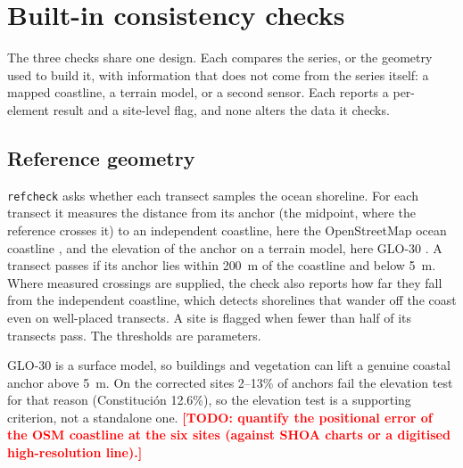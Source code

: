 \documentclass[authoryear,preprint,review,12pt]{elsarticle}
\newcommand{\todo}[1]{\textcolor{red}{\textbf{[TODO: #1]}}}
\begin{document}
\section{Built-in consistency checks}\label{sec:checks}
The three checks share one design. Each compares the series, or the geometry
used to build it, with information that does not come from the series itself:
a mapped coastline, a terrain model, or a second sensor. Each reports a
per-element result and a site-level flag, and none alters the data it checks.

\subsection{Reference geometry}\label{subsec:refcheck}
\texttt{refcheck} asks whether each transect samples the ocean shoreline. For
each transect it measures the distance from its anchor (the midpoint, where the
reference crosses it) to an independent coastline, here the OpenStreetMap ocean
coastline \citep{osmcoastline}, and the elevation of the anchor on a terrain
model, here GLO-30 \citep{glo30}. A transect passes if its anchor lies within
200~m of the coastline and below 5~m. Where measured crossings are supplied,
the check also reports how far they fall from the independent coastline, which
detects shorelines that wander off the coast even on well-placed transects. A
site is flagged when fewer than half of its transects pass. The thresholds are
parameters.

GLO-30 is a surface model, so buildings and vegetation can lift a genuine
coastal anchor above 5~m. On the corrected sites 2--13\% of anchors fail the
elevation test for that reason (Constituci\'on 12.6\%), so the elevation test
is a supporting criterion, not a standalone one.
\todo{quantify the positional error of the OSM coastline at the six sites
(against SHOA charts or a digitised high-resolution line).}
\end{document}
